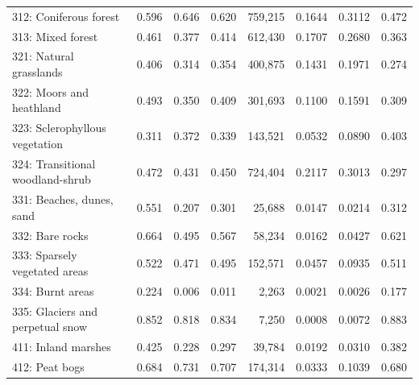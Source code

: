 \begin{table}[!hbt]
{\begin{tabular}{lrrrrrrr}
        312: Coniferous forest                                  & 0.596         & 0.646     & 0.620    & 759,215        & 0.1644        & 0.3112        & 0.472 \\
        313: Mixed forest                                       & 0.461         & 0.377     & 0.414    & 612,430        & 0.1707        & 0.2680        & 0.363 \\
        321: Natural grasslands                                 & 0.406         & 0.314     & 0.354    & 400,875        & 0.1431        & 0.1971        & 0.274 \\
        322: Moors and heathland                                & 0.493         & 0.350     & 0.409    & 301,693        & 0.1100        & 0.1591        & 0.309 \\
        323: Sclerophyllous vegetation                          & 0.311         & 0.372     & 0.339    & 143,521        & 0.0532        & 0.0890        & 0.403 \\
        324: Transitional woodland-shrub                        & 0.472         & 0.431     & 0.450    & 724,404        & 0.2117        & 0.3013        & 0.297 \\
        331: Beaches, dunes, sand                               & 0.551         & 0.207     & 0.301    &  25,688        & 0.0147        & 0.0214        & 0.312 \\
        332: Bare rocks                                         & 0.664         & 0.495     & 0.567    &  58,234        & 0.0162        & 0.0427        & 0.621 \\
        333: Sparsely vegetated areas                           & 0.522         & 0.471     & 0.495    & 152,571        & 0.0457        & 0.0935        & 0.511 \\
        334: Burnt areas                                        & 0.224         & 0.006     & 0.011    &   2,263        & 0.0021        & 0.0026        & 0.177 \\
        335: Glaciers and perpetual snow                        & 0.852         & 0.818     & 0.834    &   7,250        & 0.0008        & 0.0072        & 0.883 \\
        411: Inland marshes                                     & 0.425         & 0.228     & 0.297    &  39,784        & 0.0192        & 0.0310        & 0.382 \\
        412: Peat bogs                                          & 0.684         & 0.731     & 0.707    & 174,314        & 0.0333        & 0.1039        & 0.680 \\

\end{tabular}}
\end{table}
